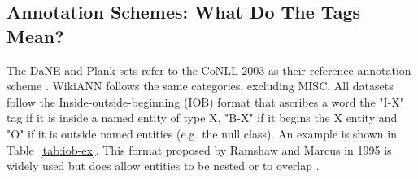 \documentclass[main.tex]{subfiles}
\begin{document}
\subsection{Annotation Schemes: What Do The Tags Mean?}
\label{subsec:annoschemes}
The DaNE and Plank sets refer to the CoNLL-2003 as their reference annotation scheme \cite[Sec. 4]{hvingelby2020dane} \cite[Sec. 2.1]{plank2019neural}.
WikiANN follows the same categories, excluding MISC.
All datasets follow the Inside-outside-beginning (IOB) format that ascribes a word the "I-X" tag if it is inside a named entity of type X, "B-X" if it begins the X entity and "O" if it is outside named entities (e.g. the null class).
An example is shown in Table~\ref{tab:iob-ex}.
This format proposed by Ramshaw and Marcus in 1995 is widely used but does allow entities to be nested or to overlap \cite{ramshaw1995IOB}.
\end{document}
